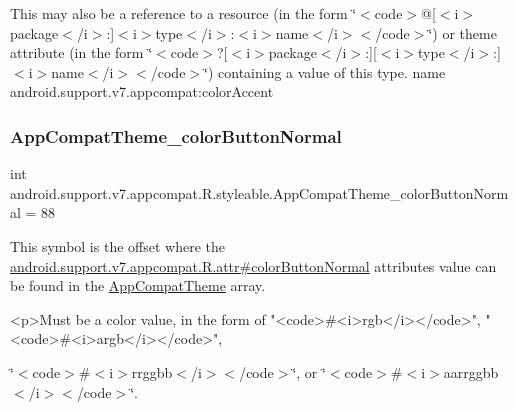 This may also be a reference to a resource (in the form \char`\"{}$<$code$>$@\mbox{[}$<$i$>$package$<$/i$>$\+:\mbox{]}$<$i$>$type$<$/i$>$\+:$<$i$>$name$<$/i$>$$<$/code$>$\char`\"{}) or theme attribute (in the form \char`\"{}$<$code$>$?\mbox{[}$<$i$>$package$<$/i$>$\+:\mbox{]}\mbox{[}$<$i$>$type$<$/i$>$\+:\mbox{]}$<$i$>$name$<$/i$>$$<$/code$>$\char`\"{}) containing a value of this type.  name android.\+support.\+v7.\+appcompat\+:color\+Accent \mbox{\label{classandroid_1_1support_1_1v7_1_1appcompat_1_1R_1_1styleable_a8b1a254d15e9a8ad527d4515f5395b3c}} 
\subsubsection{\texorpdfstring{App\+Compat\+Theme\+\_\+color\+Button\+Normal}{AppCompatTheme\_colorButtonNormal}}
{\footnotesize\ttfamily int android.\+support.\+v7.\+appcompat.\+R.\+styleable.\+App\+Compat\+Theme\+\_\+color\+Button\+Normal = 88\hspace{0.3cm}{\ttfamily [static]}}

This symbol is the offset where the \hyperlink{classandroid_1_1support_1_1v7_1_1appcompat_1_1R_1_1attr_a8ff054167c209f5d016ea6c4c3ed9ddb}{android.\+support.\+v7.\+appcompat.\+R.\+attr\#color\+Button\+Normal} attribute\textquotesingle{}s value can be found in the \hyperlink{classandroid_1_1support_1_1v7_1_1appcompat_1_1R_1_1styleable_a5c42f89e8a410c323be34208d75c430b}{App\+Compat\+Theme} array.

\begin{DoxyVerb}      <p>Must be a color value, in the form of "<code>#<i>rgb</i></code>", "<code>#<i>argb</i></code>",
\end{DoxyVerb}
 \char`\"{}$<$code$>$\#$<$i$>$rrggbb$<$/i$>$$<$/code$>$\char`\"{}, or \char`\"{}$<$code$>$\#$<$i$>$aarrggbb$<$/i$>$$<$/code$>$\char`\"{}. 

